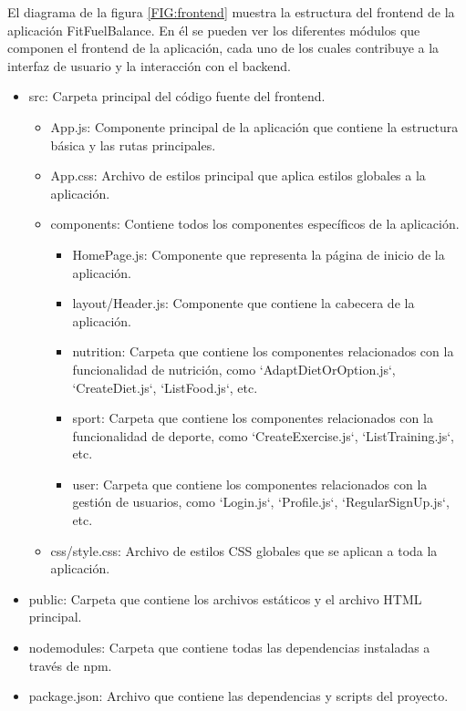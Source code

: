 El diagrama de la figura \ref{FIG:frontend} muestra la estructura del frontend de la aplicación FitFuelBalance. En él se pueden ver los diferentes módulos que componen el frontend de la aplicación, cada uno de los cuales contribuye a la interfaz de usuario y la interacción con el backend.

\begin{itemize}
  \item src: Carpeta principal del código fuente del frontend.
    \begin{itemize}
      \item App.js: Componente principal de la aplicación que contiene la estructura básica y las rutas principales.
      \item App.css: Archivo de estilos principal que aplica estilos globales a la aplicación.
      \item components: Contiene todos los componentes específicos de la aplicación.
        \begin{itemize}
          \item HomePage.js: Componente que representa la página de inicio de la aplicación.
          \item layout/Header.js: Componente que contiene la cabecera de la aplicación.
          \item nutrition: Carpeta que contiene los componentes relacionados con la funcionalidad de nutrición, como `AdaptDietOrOption.js`, `CreateDiet.js`, `ListFood.js`, etc.
          \item sport: Carpeta que contiene los componentes relacionados con la funcionalidad de deporte, como `CreateExercise.js`, `ListTraining.js`, etc.
          \item user: Carpeta que contiene los componentes relacionados con la gestión de usuarios, como `Login.js`, `Profile.js`, `RegularSignUp.js`, etc.
        \end{itemize}
      \item css/style.css: Archivo de estilos CSS globales que se aplican a toda la aplicación.
    \end{itemize}
  \item public: Carpeta que contiene los archivos estáticos y el archivo HTML principal.
  \item nodemodules: Carpeta que contiene todas las dependencias instaladas a través de npm.
  \item package.json: Archivo que contiene las dependencias y scripts del proyecto.
\end{itemize}

